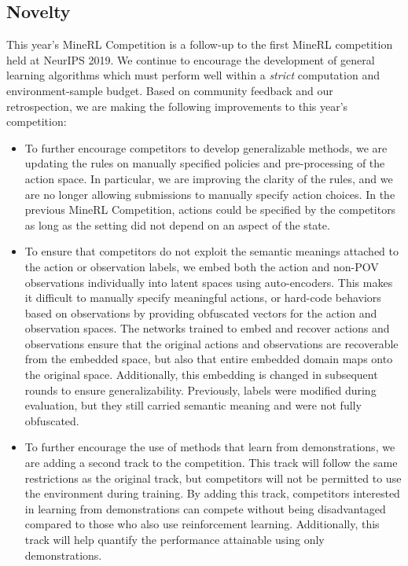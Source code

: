 \subsection{Novelty} \label{sec:novelty}

This year's MineRL Competition is a follow-up to the first MineRL competition held at NeurIPS 2019.
We continue to encourage the development of general learning algorithms which must perform well within a \emph{strict} computation and environment-sample budget. 
Based on community feedback and our retrospection, we are making the following improvements to this year's competition:

\begin{itemize}
    \item To further encourage competitors to develop generalizable methods, we are updating the rules on manually specified policies and pre-processing of the action space. In particular, we are improving the clarity of the rules, and we are no longer allowing submissions to manually specify action choices. In the previous MineRL Competition, actions could be specified by the competitors as long as the setting did not depend on an aspect of the state.
    \item To ensure that competitors do not exploit the semantic meanings attached to the action or observation labels, we embed both the action and non-POV observations individually into latent spaces using auto-encoders. This makes it difficult to manually specify meaningful actions, or hard-code behaviors based on observations by providing obfuscated vectors for the action and observation spaces. The networks trained to embed and recover actions and observations ensure that the original actions and observations are recoverable from the embedded space, but also that entire embedded domain maps onto the original space. Additionally, this embedding is changed in subsequent rounds to ensure generalizability. Previously, labels were modified during evaluation, but they still carried semantic meaning and were not fully obfuscated.
    \item To further encourage the use of methods that learn from demonstrations, we are adding a second track to the competition. This track will follow the same restrictions as the original track, but competitors will not be permitted to use the environment during training. By adding this track, competitors interested in learning from demonstrations can compete without being disadvantaged compared to those who also use reinforcement learning. Additionally, this track will help quantify the performance attainable using only demonstrations.
\end{itemize}

